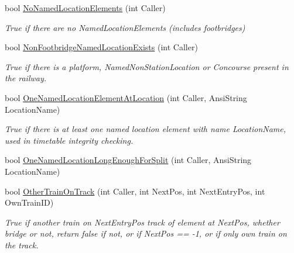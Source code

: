 \begin{DoxyCompactItemize}
\mbox{\label{class_t_track_ab079bfd6871c5337b29297e7bc2cfe8b}} 
bool \mbox{\hyperlink{class_t_track_ab079bfd6871c5337b29297e7bc2cfe8b}{No\+Named\+Location\+Elements}} (int Caller)
\begin{DoxyCompactList}\small\item\em True if there are no Named\+Location\+Elements (includes footbridges) \end{DoxyCompactList}\item 
\mbox{\label{class_t_track_adb8c5f303e4977a8ea92c7b706a1d4e5}} 
bool \mbox{\hyperlink{class_t_track_adb8c5f303e4977a8ea92c7b706a1d4e5}{Non\+Footbridge\+Named\+Location\+Exists}} (int Caller)
\begin{DoxyCompactList}\small\item\em True if there is a platform, Named\+Non\+Station\+Location or Concourse present in the railway. \end{DoxyCompactList}\item 
\mbox{\label{class_t_track_a7eba939947b4c035a191ecaaf1b0bb9a}} 
bool \mbox{\hyperlink{class_t_track_a7eba939947b4c035a191ecaaf1b0bb9a}{One\+Named\+Location\+Element\+At\+Location}} (int Caller, Ansi\+String Location\+Name)
\begin{DoxyCompactList}\small\item\em True if there is at least one named location element with name \textquotesingle{}Location\+Name\textquotesingle{}, used in timetable integrity checking. \end{DoxyCompactList}\item 
bool \mbox{\hyperlink{class_t_track_a9d209cb6e24f67ba12020440a5e42347}{One\+Named\+Location\+Long\+Enough\+For\+Split}} (int Caller, Ansi\+String Location\+Name)
\item 
\mbox{\label{class_t_track_aeac90568597c9f13a27fa90c58f9041f}} 
bool \mbox{\hyperlink{class_t_track_aeac90568597c9f13a27fa90c58f9041f}{Other\+Train\+On\+Track}} (int Caller, int Next\+Pos, int Next\+Entry\+Pos, int Own\+Train\+ID)
\begin{DoxyCompactList}\small\item\em True if another train on Next\+Entry\+Pos track of element at Next\+Pos, whether bridge or not, return false if not, or if Next\+Pos == -\/1, or if only own train on the track. \end{DoxyCompactList}\item 

\end{DoxyCompactItemize}
